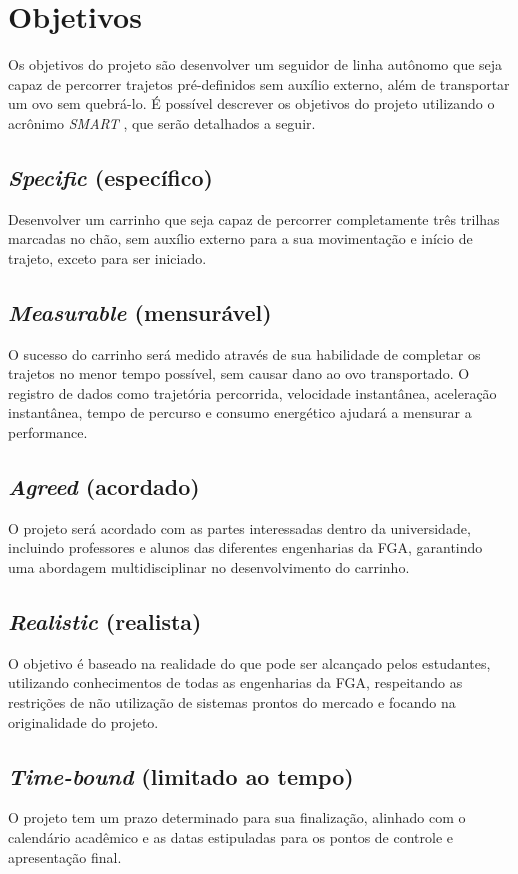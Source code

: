 \section{Objetivos}

Os objetivos do projeto são desenvolver um seguidor de linha autônomo que seja
capaz de percorrer trajetos pré-definidos sem auxílio externo, além de
transportar um ovo sem quebrá-lo. É possível descrever os objetivos do projeto
utilizando o acrônimo \textit{SMART}
\cite{University-of-California:SMART-Goals}, que serão detalhados a seguir.

\subsection{\textit{Specific} (específico)}

Desenvolver um carrinho que seja capaz de percorrer completamente três trilhas
marcadas no chão, sem auxílio externo para a sua movimentação e início de
trajeto, exceto para ser iniciado.

\subsection{\textit{Measurable} (mensurável)}

O sucesso do carrinho será medido através de sua habilidade de completar os
trajetos no menor tempo possível, sem causar dano ao ovo transportado. O
registro de dados como trajetória percorrida, velocidade instantânea, aceleração
instantânea, tempo de percurso e consumo energético ajudará a mensurar a
performance.

\subsection{\textit{Agreed} (acordado)}

O projeto será acordado com as partes interessadas dentro da universidade,
incluindo professores e alunos das diferentes engenharias da FGA, garantindo uma
abordagem multidisciplinar no desenvolvimento do carrinho.

\subsection{\textit{Realistic} (realista)}

O objetivo é baseado na realidade do que pode ser alcançado pelos estudantes,
utilizando conhecimentos de todas as engenharias da FGA, respeitando as
restrições de não utilização de sistemas prontos do mercado e focando na
originalidade do projeto.

\subsection{\textit{Time-bound} (limitado ao tempo)}

O projeto tem um prazo determinado para sua finalização, alinhado com o
calendário acadêmico e as datas estipuladas para os pontos de controle e
apresentação final.
